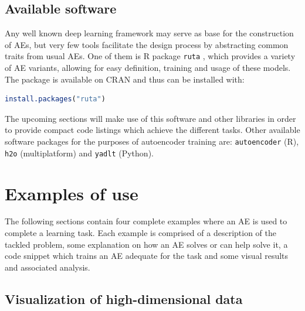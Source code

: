 
\subsection{Available software}

Any well known deep learning framework may serve as base for the construction of AEs, but very few tools facilitate the design process by abstracting common traits from usual AEs. One of them is R package \texttt{ruta} \cite{ruta}, which provides a variety of AE variants, allowing for easy definition, training and usage of these models. The package is available on CRAN and thus can be installed with:

\begin{lstlisting}[language=R]
install.packages("ruta")
\end{lstlisting}

The upcoming sections will make use of this software and other libraries in order to provide compact code listings which achieve the different tasks. %
Other available software packages for the purposes of autoencoder training are: \texttt{autoencoder} (R), \texttt{h2o} (multiplatform) and \texttt{yadlt} (Python).

\section{Examples of use}
\label{p4sec.examples}

The following sections contain four complete examples where an AE is used to complete a learning task. Each example is comprised of a description of the tackled problem, some explanation on how an AE solves or can help solve it, a code snippet which trains an AE adequate for the task and some visual results and associated analysis.

\subsection{Visualization of high-dimensional data} %
\label{p4sec.visualization}


